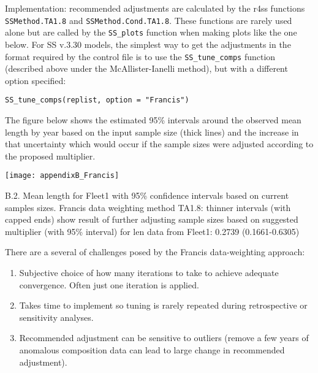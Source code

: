
Implementation: recommended adjustments are calculated by the r4ss functions \texttt{SSMethod.TA1.8} and \texttt{SSMethod.Cond.TA1.8}. These functions are rarely used alone but are called by the \texttt{SS\_plots} function when making plots like the one below. For SS v.3.30 models, the simplest way to get the adjustments in the format required by the control file is to use the \texttt{SS\_tune\_comps} function (described above under the McAllister-Ianelli method), but with a different option specified: 

\texttt{SS\_tune\_comps(replist, option = "Francis")}

The figure below shows the estimated 95\% intervals around the observed mean length by year based on the input sample size (thick lines) and the increase in that uncertainty which would occur if the sample sizes were adjusted according to the proposed multiplier.

\begin{center}
	\texttt{[image: appendixB\_Francis]}\\
\end{center}
\figurename{ B.2. Mean length for Fleet1 with 95\% confidence intervals based on current samples sizes. Francis data weighting method TA1.8: thinner intervals (with capped ends) show result of further adjusting sample sizes based on suggested multiplier (with 95\% interval) for len data from Fleet1: 0.2739 (0.1661-0.6305)}

There are a several of challenges posed by the Francis data-weighting approach:
\begin{enumerate}
	\item Subjective choice of how many iterations to take to achieve adequate convergence. Often just one iteration is applied.
	
	\item Takes time to implement so tuning is rarely repeated during retrospective or sensitivity analyses.
	
	\item Recommended adjustment can be sensitive to outliers (remove a few years of anomalous composition data can lead to large change in recommended adjustment).
\end{enumerate}


